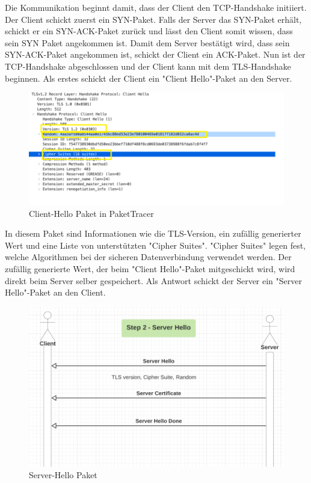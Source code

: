 Die Kommunikation beginnt damit, dass der Client den TCP-Handshake initiiert. Der Client schickt zuerst ein SYN-Paket. Falls der Server das SYN-Paket erhält, schickt er ein SYN-ACK-Paket zurück und lässt den Client somit wissen, dass sein SYN Paket angekommen ist. Damit dem Server bestätigt wird, dass sein SYN-ACK-Paket angekommen ist, schickt der Client ein ACK-Paket. Nun ist der TCP-Handshake abgeschlossen und der Client kann mit dem TLS-Handshake beginnen. Als erstes schickt der Client ein "Client Hello"-Paket an den Server.

\begin{figure}[H]
    \centering
    \includegraphics{media/OpenSSL/pt.png}
    \caption{Client-Hello Paket in PaketTracer \cite{DeepDiveTLS}}
\end{figure}

In diesem Paket sind Informationen wie die TLS-Version, ein zufällig generierter Wert und eine Liste von unterstützten "Cipher Suites". "Cipher Suites" legen fest, welche Algorithmen bei der sicheren Datenverbindung verwendet werden. Der zufällig generierte Wert, der beim "Client Hello"-Paket mitgeschickt wird, wird direkt beim Server selber gespeichert. Als Antwort schickt der Server ein "Server Hello"-Paket an den Client. 

\begin{figure}[H]
    \centering
    \includegraphics{media/OpenSSL/hello.png}
    \caption{Server-Hello Paket \cite{DeepDiveTLS}} 
\end{figure}

